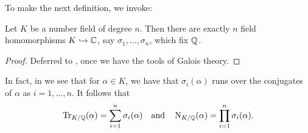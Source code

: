 To make the next definition, we invoke:
\begin{theorem}
	Let $K$ be a number field of degree $n$.
	Then there are exactly $n$ field homomorphisms $K \hookrightarrow \mathbb C$,
	say $\sigma_1, \dots, \sigma_n$, which fix $\mathbb Q$.
\end{theorem}
\begin{proof}
	Deferred to , once we have the tools of Galois theory.
\end{proof}
In fact, in  we see that
for $\alpha \in K$, we have that $\sigma_i(\alpha)$
runs over the conjugates of $\alpha$ as $i=1,\dots,n$.
It follows that
\[
	\operatorname{Tr}_{K/\mathbb Q}(\alpha) = \sum_{i=1}^n \sigma_i(\alpha)
	\quad\text{and}\quad
	\operatorname{N}_{K/\mathbb Q}(\alpha) = \prod_{i=1}^n \sigma_i(\alpha).
\]

